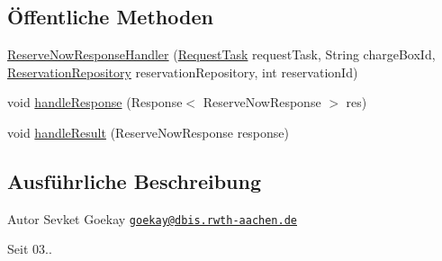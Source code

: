 \subsection*{Öffentliche Methoden}
\begin{DoxyCompactItemize}
\item 
\hyperlink{classde_1_1rwth_1_1idsg_1_1steve_1_1handler_1_1ocpp15_1_1_reserve_now_response_handler_a4fa6d13611deb6163089281485a7bad9}{Reserve\-Now\-Response\-Handler} (\hyperlink{classde_1_1rwth_1_1idsg_1_1steve_1_1web_1_1_request_task}{Request\-Task} request\-Task, String charge\-Box\-Id, \hyperlink{interfacede_1_1rwth_1_1idsg_1_1steve_1_1repository_1_1_reservation_repository}{Reservation\-Repository} reservation\-Repository, int reservation\-Id)
\item 
void \hyperlink{classde_1_1rwth_1_1idsg_1_1steve_1_1handler_1_1ocpp15_1_1_reserve_now_response_handler_a87ced966527b9d1596e163c4b38aa851}{handle\-Response} (Response$<$ Reserve\-Now\-Response $>$ res)
\item 
void \hyperlink{classde_1_1rwth_1_1idsg_1_1steve_1_1handler_1_1ocpp15_1_1_reserve_now_response_handler_a8a9abad92eff0284e98129aaf31e811e}{handle\-Result} (Reserve\-Now\-Response response)
\end{DoxyCompactItemize}


\subsection{Ausführliche Beschreibung}
\begin{DoxyAuthor}{Autor}
Sevket Goekay \href{mailto:goekay@dbis.rwth-aachen.de}{\tt goekay@dbis.\-rwth-\/aachen.\-de} 
\end{DoxyAuthor}
\begin{DoxySince}{Seit}
03.. 
\end{DoxySince}


